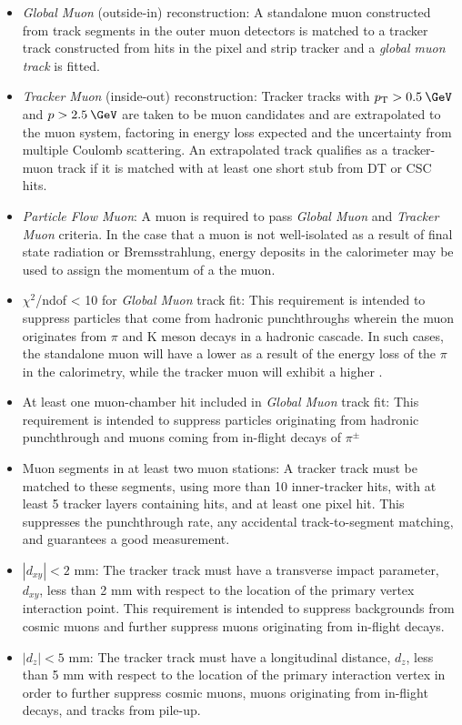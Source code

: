 \begin{itemize}
  \item \textit{Global Muon} (outside-in) reconstruction: A standalone muon constructed from track segments in the outer muon detectors is matched to a tracker track constructed from hits in the pixel and strip tracker and a \textit{global muon track} is fitted.
  \item \textit{Tracker Muon} (inside-out) reconstruction: Tracker tracks with $\pt > 0.5\:\GeV$ and $p > 2.5\:\GeV$ are taken to be muon candidates and are extrapolated to the muon system, factoring in energy loss expected and the uncertainty from multiple Coulomb scattering. An extrapolated track qualifies as a tracker-muon track if it is matched with at least one short stub from DT or CSC hits.
  \item \textit{Particle Flow Muon}: A muon is required to pass \textit{Global Muon} and \textit{Tracker Muon} criteria. In the case that a muon is not well-isolated as a result of final state radiation or Bremsstrahlung, energy deposits in the calorimeter may be used to assign the momentum of a the muon.
  \item $\chi^2$/ndof < 10 for \textit{Global Muon} track fit: This requirement is intended to suppress particles that come from hadronic punchthroughs wherein the muon originates from $\pi$ and K meson decays in a hadronic cascade. In such cases, the standalone muon will have a lower \pt as a result of the energy loss of the $\pi$ in the calorimetry, while the tracker muon will exhibit a higher \pt.
  \item At least one muon-chamber hit included in \textit{Global Muon} track fit: This requirement is intended to suppress particles originating from hadronic punchthrough and muons coming from in-flight decays of $\pi^\pm$
  \item Muon segments in at least two muon stations: A tracker track must be matched to these segments, using more than 10 inner-tracker hits, with at least 5 tracker layers containing hits, and at least one pixel hit. This suppresses the punchthrough rate, any accidental track-to-segment matching, and guarantees a good \pt measurement.
  \item $|{d_{xy}}|<2$ mm: The tracker track must have a transverse impact parameter, ${d_{xy}}$, less than 2 mm with respect to the location of the primary vertex interaction point. This requirement is intended to suppress backgrounds from cosmic muons and further suppress muons originating from in-flight decays.
  \item $|{d_{z}}|<5$ mm: The tracker track must have a longitudinal distance, ${d_{z}}$, less than 5 mm with respect to the location of the primary interaction vertex in order to further suppress cosmic muons, muons originating from in-flight decays, and tracks from pile-up. 
\end{itemize}

